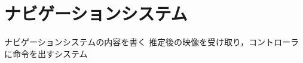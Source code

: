 \section{ナビゲーションシステム}
\label{implement_navigation}

ナビゲーションシステムの内容を書く
推定後の映像を受け取り，コントローラに命令を出すシステム

